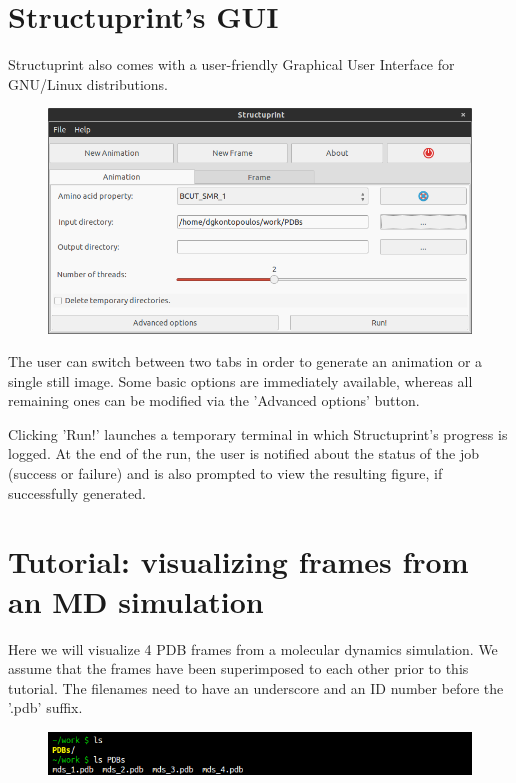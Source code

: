 \documentclass[12pt,a4paper]{article}
\begin{document}
\newpage

\section{Structuprint's GUI}
Structuprint also comes with a user-friendly Graphical User Interface for 
GNU/Linux distributions. 

\begin{figure}[!htbp]
    \centering
	\includegraphics[width=\textwidth]{figures/gui.png}
\end{figure}

The user can switch between two tabs in order to generate an animation or a 
single still image. Some basic options are immediately available, whereas 
all remaining ones can be modified via the 'Advanced options' button.

Clicking 'Run!' launches a temporary terminal in which Structuprint's progress is 
logged. At the end of the run, the user is notified about the status of the 
job (success or failure) and is also prompted to view the resulting figure, if 
successfully generated.

\newpage

\section{Tutorial: visualizing frames from an MD simulation}
Here we will visualize 4 PDB frames from a molecular dynamics 
simulation. We assume that the frames have been superimposed 
to each other prior to this tutorial. The filenames need to have an 
underscore and an ID number before the '.pdb' suffix.
\vspace{-0.5cm}
\begin{figure}[!htbp]
    \centering
	\includegraphics[width=\textwidth]{figures/tutorial/1.png}
\end{figure}
\end{document}
